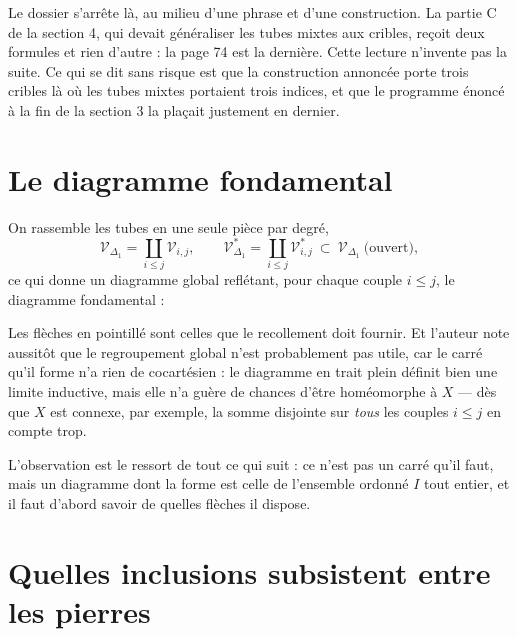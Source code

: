 \documentclass[11pt,a4paper]{article}
\begin{document}
\begin{resume}
Le dossier s'arrête là, au milieu d'une phrase et d'une construction. La partie
C de la section 4, qui devait généraliser les tubes mixtes aux cribles, reçoit
deux formules et rien d'autre : la page 74 est la dernière. Cette lecture
n'invente pas la suite. Ce qui se dit sans risque est que la construction
annoncée porte trois cribles là où les tubes mixtes portaient trois indices, et
que le programme énoncé à la fin de la section 3 la plaçait justement en
dernier.

\end{resume}

\section*{Le diagramme fondamental}

On rassemble les tubes en une seule pièce par degré,
\[
  \mathcal{V}_{\Delta_{1}} = \coprod_{i \leq j} \mathcal{V}_{i,j},
  \qquad
  \mathcal{V}^{*}_{\Delta_{1}} = \coprod_{i \leq j} \mathcal{V}^{*}_{i,j}
  \ \subset \ \mathcal{V}_{\Delta_{1}} \ \text{(ouvert)},
\]
ce qui donne un diagramme global reflétant, pour chaque couple $i \leq j$, le
diagramme fondamental :


Les flèches en pointillé sont celles que le recollement doit fournir. Et
l'auteur note aussitôt que le regroupement global n'est probablement pas utile,
car le carré qu'il forme n'a rien de cocartésien : le diagramme en trait plein
définit bien une limite inductive, mais elle n'a guère de chances d'être
homéomorphe à $X$ — dès que $X$ est connexe, par exemple, la somme disjointe sur
\emph{tous} les couples $i \leq j$ en compte trop.

L'observation est le ressort de tout ce qui suit : ce n'est pas un carré qu'il
faut, mais un diagramme dont la forme est celle de l'ensemble ordonné $I$ tout
entier, et il faut d'abord savoir de quelles flèches il dispose.

\section*{Quelles inclusions subsistent entre les pierres}
\end{document}
